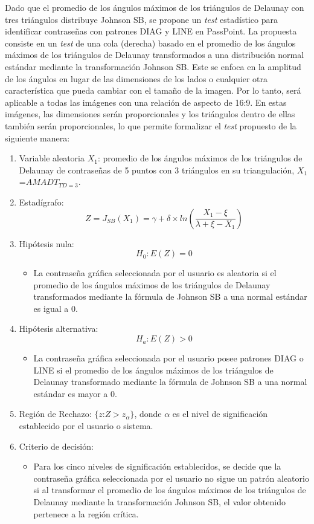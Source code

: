 \documentclass[12pt]{report}
\begin{document}
Dado  que el promedio de los ángulos máximos de los triángulos de Delaunay con tres triángulos distribuye Johnson SB, se propone un  \textit{test} estadístico para identificar contraseñas con patrones DIAG y LINE en PassPoint. La propuesta consiste en un \textit{test} de una cola (derecha) basado en el promedio de los ángulos máximos de los triángulos de Delaunay transformados a una distribución normal estándar mediante la transformación Johnson SB.
Este se enfoca en la amplitud de los ángulos en lugar de las dimensiones de los lados o cualquier otra característica que pueda cambiar con el tamaño de la imagen. Por lo tanto, será aplicable a todas las imágenes con una relación de aspecto de 16:9. En estas imágenes, las dimensiones serán proporcionales y los triángulos dentro de ellas también serán proporcionales, lo que permite formalizar el \textit{test} propuesto de la siguiente manera:

\begin{enumerate}
	\item Variable aleatoria $X_1$: promedio de los ángulos máximos de los triángulos de Delaunay de contraseñas de 5 puntos con 3 triángulos en su triangulación, $X_1$=$AMADT_{TD=3}$.
	\item Estadígrafo: \[
	Z= J_{SB}(X_1) =  \gamma + \delta \times ln\left(\frac{X_1 - \xi}{\lambda + \xi - X_1}\right)
	\]

	\item Hipótesis nula: \[H_0:E(Z)=0\]
	\begin{itemize}
		\item La contraseña gráfica seleccionada por el usuario es aleatoria si el promedio de los ángulos máximos de los triángulos de Delaunay  transformados mediante la fórmula de Johnson SB a una normal estándar es igual a 0.
	\end{itemize}
	
	
	\item Hipótesis alternativa: \[H_a:E(Z)>0\]
			\begin{itemize}
			\item La contraseña gráfica seleccionada por el usuario posee patrones DIAG o LINE  si el promedio de los ángulos máximos de los triángulos de Delaunay  transformado mediante la fórmula de Johnson SB a una normal estándar es mayor a 0.
		\end{itemize}
	
	\item  Región de Rechazo: $\{z$:$Z>z_\alpha\}$, donde $\alpha$ es el nivel de significación establecido por el usuario o sistema. 
	
	\item Criterio de decisión:
	\begin{itemize}
		\item Para los cinco niveles de significación establecidos, se decide que la contraseña gráfica seleccionada por el usuario no sigue un patrón aleatorio si al transformar el promedio de los ángulos máximos de los triángulos de Delaunay mediante la transformación Johnson SB, el valor obtenido pertenece a la región crítica. 
	\end{itemize}
	\end{enumerate}	 
\end{document}
